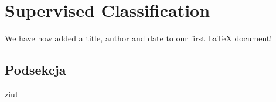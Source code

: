 \section{Supervised Classification}
\label{sec:supervised_classification}
We have now added a title, author and date to our first \LaTeX{} document!
\subsection{Podsekcja}
ziut